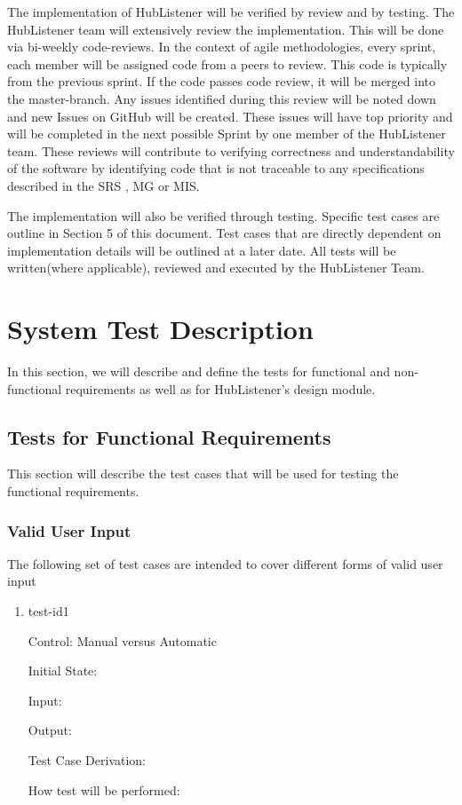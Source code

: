 \documentclass[12pt, titlepage]{article}
\begin{document}
The implementation of HubListener will be verified by review and by testing. The HubListener team will extensively review the implementation. This will be done via bi-weekly code-reviews. In the context of agile methodologies, every sprint, each member will be assigned code from a peers to review. This code is typically from the previous sprint. If the code passes code review, it will be merged into the master-branch. Any issues identified during this review will be noted down and new Issues on GitHub will be created. These issues will have top priority and will be completed in the next possible Sprint by one member of the HubListener team. These reviews will contribute to verifying correctness and understandability of the software by identifying code that is not traceable to any specifications described in the SRS , MG or MIS.
\newline

The implementation will also be verified through testing. Specific test cases are outline in Section 5 of this document. Test cases that are directly dependent on implementation details will be outlined at a later date. All tests will be written(where applicable), reviewed and executed by the HubListener Team. 

\section{System Test Description}
In this section, we will describe and define the tests for functional and non-functional requirements as well as for HubListener's design module.

\subsection{Tests for Functional Requirements }
This section will describe the test cases that will be used for testing the functional requirements.

\subsubsection{Valid User Input}
The following set of test cases are intended to cover different forms of valid user input 

\begin{enumerate}
\item{test-id1\\}

Control: Manual versus Automatic
					
Initial State: 
					
Input: 
					
Output: 

Test Case Derivation: 
					
How test will be performed: 
\end{enumerate}
\end{document}
